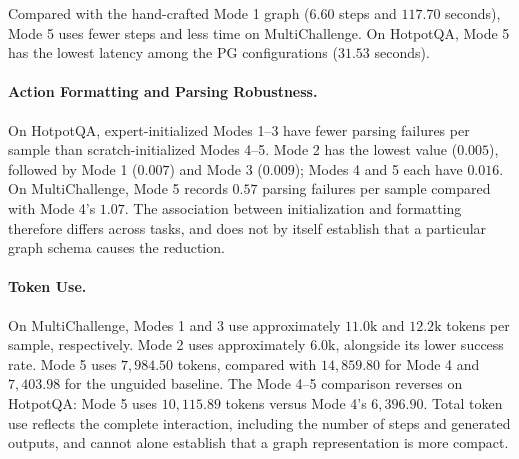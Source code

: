 Compared with the hand-crafted Mode 1 graph ($6.60$ steps and $117.70$ seconds), Mode 5 uses fewer steps and less time on MultiChallenge. On HotpotQA, Mode 5 has the lowest latency among the PG configurations ($31.53$ seconds).
\paragraph{Action Formatting and Parsing Robustness.}
On HotpotQA, expert-initialized Modes 1--3 have fewer parsing failures per sample than scratch-initialized Modes 4--5. Mode 2 has the lowest value ($0.005$), followed by Mode 1 ($0.007$) and Mode 3 ($0.009$); Modes 4 and 5 each have $0.016$. On MultiChallenge, Mode 5 records $0.57$ parsing failures per sample compared with Mode 4's $1.07$. The association between initialization and formatting therefore differs across tasks, and does not by itself establish that a particular graph schema causes the reduction.
\paragraph{Token Use.}
On MultiChallenge, Modes 1 and 3 use approximately $11.0\text{k}$ and $12.2\text{k}$ tokens per sample, respectively. Mode 2 uses approximately $6.0\text{k}$, alongside its lower success rate. Mode 5 uses $7{,}984.50$ tokens, compared with $14{,}859.80$ for Mode 4 and $7{,}403.98$ for the unguided baseline. The Mode 4--5 comparison reverses on HotpotQA: Mode 5 uses $10{,}115.89$ tokens versus Mode 4's $6{,}396.90$. Total token use reflects the complete interaction, including the number of steps and generated outputs, and cannot alone establish that a graph representation is more compact.

